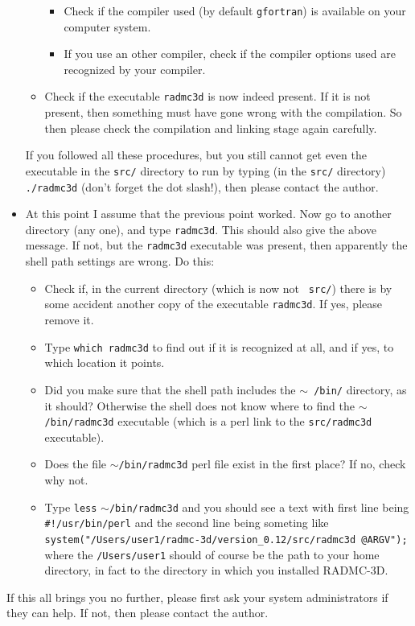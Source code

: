 \documentclass{report}
\begin{document}
\begin{itemize}
\begin{itemize}
    \begin{itemize}
    \item Check if the compiler used (by default {\small\tt gfortran}) is
      available on your computer system.
    \item If you use an other compiler, check if the compiler options used
      are recognized by your compiler.
    \end{itemize}
  \item Check if the executable {\small\tt radmc3d} is now indeed present.
    If it is not present, then something must have gone wrong with the
    compilation. So then please check the compilation and linking stage
    again carefully. 
  \end{itemize}
  If you followed all these procedures, but you still cannot get even the
  executable in the {\small\tt src/} directory to run by typing (in the
  {\small\tt src/} directory) {\small\tt ./radmc3d} (don't forget the dot
  slash!), then please contact the author.
\item At this point I assume that the previous point worked. Now go to
  another directory (any one), and type {\small\tt radmc3d}.  This should
  also give the above message. If not, but the {\small\tt radmc3d} executable
  was present, then apparently the shell path settings are wrong. Do this:
  \begin{itemize}
  \item Check if, in the current directory (which is now not {\small\tt
      src/}) there is by some accident another copy of the executable
    {\small\tt radmc3d}. If yes, please remove it. 
  \item Type {\small\tt which radmc3d} to find out if it is recognized at all,
    and if yes, to which location it points. 
  \item Did you make sure that the shell path includes the $\sim${\small\tt
      /bin/} directory, as it should? Otherwise the shell does not know 
    where to find the $\sim${\small\tt /bin/radmc3d} executable (which is
    a perl link to the {\small\tt src/radmc3d} executable).
  \item Does the file $\sim${\small\tt /bin/radmc3d} perl file exist in the
    first place? If no, check why not. 
  \item Type {\small\tt less} $\sim${\small\tt /bin/radmc3d} and you should
    see a text with first line being {\small\tt \#!/usr/bin/perl} and the
    second line being someting like {\small\tt 
      system("/Users/user1/radmc-3d/version\_0.12/src/radmc3d @ARGV");}
    where the {\small\tt /Users/user1} should of course be the path to
    your home directory, in fact to the directory in which you installed
    RADMC-3D.
  \end{itemize}
\end{itemize}
If this all brings you no further, please first ask your system
administrators if they can help. If not, then please contact the author.
\end{document}
